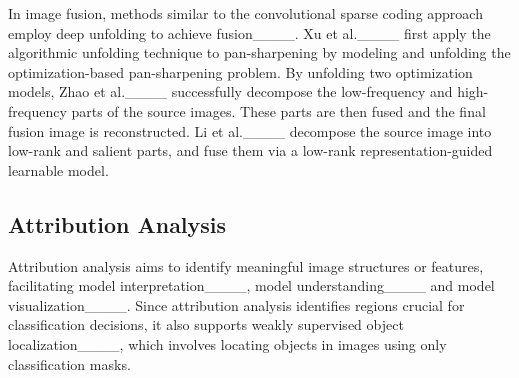 In image fusion, methods similar to the convolutional sparse coding approach employ deep unfolding to achieve fusion____. Xu et al.____ first apply the algorithmic unfolding technique to pan-sharpening by modeling and unfolding the optimization-based pan-sharpening problem. By unfolding two optimization models, Zhao et al.____ successfully decompose the low-frequency and high-frequency parts of the source images. These parts are then fused and the final fusion image is reconstructed. Li et al.____ decompose the source image into low-rank and salient parts, and fuse them via a low-rank representation-guided learnable model.

\subsection{Attribution Analysis}
Attribution analysis aims to identify meaningful image structures or features, facilitating model interpretation____, model understanding____ and model visualization____. 
Since attribution analysis identifies regions crucial for classification decisions, it also supports weakly supervised object localization____, which involves locating objects in images using only classification masks.

